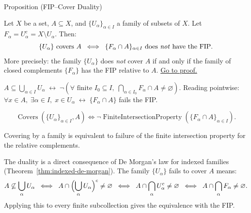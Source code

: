 
\begin{propositionbox}{Proposition (FIP--Cover Duality)}
\begin{proposition}\label{prop:fip-duality}
Let $X$ be a set, $A \subseteq X$, and $\{U_\alpha\}_{\alpha \in I}$ a
family of subsets of $X$. Let $F_\alpha = U_\alpha^c = X \setminus U_\alpha$.
Then:
\[
\{U_\alpha\} \text{ covers } A
\;\;\Longleftrightarrow\;\;
\{F_\alpha \cap A\}_{\alpha \in I} \text{ does \emph{not} have the FIP}.
\]
More precisely: the family $\{U_\alpha\}$ does \emph{not} cover $A$ if and
only if the family of closed complements $\{F_\alpha\}$ has the FIP relative
to $A$.
\hyperref[prf:fip-duality]{Go to proof.}
\end{proposition}
\end{propositionbox}

\begin{remark*}
$A \subseteq \bigcup_{\alpha \in I} U_\alpha \;\leftrightarrow\; \neg(\forall\text{ finite }I_0\subseteq I,\; \bigcap_{\alpha\in I_0} F_\alpha \cap A \neq \varnothing)$. Reading pointwise: $\forall x\in A,\;\exists\alpha\in I,\; x\in U_\alpha \;\leftrightarrow\; \{F_\alpha\cap A\}$ fails the FIP.
\end{remark*}

\begin{remark*}
\[
  \operatorname{Covers}(\{U_\alpha\}_{\alpha\in I},A)
  \iff
  \neg\operatorname{FiniteIntersectionProperty}(\{F_\alpha\cap A\}_{\alpha\in I}).
\]
\end{remark*}


\begin{remark*}[Interpretation]
Covering by a family is equivalent to failure of the finite intersection
property for the relative complements.
\end{remark*}

\begin{remark*}[Exposition]
The duality is a direct consequence of De Morgan's law for indexed families
(Theorem~\ref{thm:indexed-de-morgan}). The family $\{U_\alpha\}$ fails to cover
$A$ means:
\[
A \not\subseteq \bigcup_\alpha U_\alpha
\;\;\Longleftrightarrow\;\;
A \cap \Bigl(\bigcup_\alpha U_\alpha\Bigr)^c \neq \varnothing
\;\;\Longleftrightarrow\;\;
A \cap \bigcap_\alpha U_\alpha^c \neq \varnothing
\;\;\Longleftrightarrow\;\;
A \cap \bigcap_\alpha F_\alpha \neq \varnothing.
\]
Applying this to every finite subcollection gives the equivalence with the FIP.
\end{remark*}

